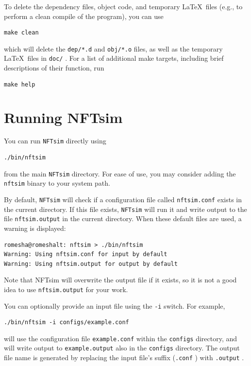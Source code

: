 \documentclass[12pt,a4paper]{article}
\newcommand{\type}[1]{{\small\small\tt #1} }
\newcommand{\NF}[0]{\type{NFTsim}}
\begin{document}
To delete the dependency files, object code, and temporary \LaTeX\ files (e.g., to perform a clean compile of the program), you can use
\begin{lstlisting}
make clean
\end{lstlisting}
which will delete the \type{dep/*.d} and \type{obj/*.o} files, as well as the temporary \LaTeX\ files in \type{doc/}. For a list of additional make targets, including brief descriptions of their function, run
\begin{lstlisting}
make help
\end{lstlisting}

\section{Running NFTsim}
\label{sec:running}
You can run \NF directly using

\begin{lstlisting}
./bin/nftsim
\end{lstlisting}

from the main \NF directory. For ease of use, you may consider adding the \type{nftsim} binary to your system path.

By default, \NF will check if a configuration file called \type{nftsim.conf} exists in the current directory. If this file exists, \NF will run it and write output to the file \type{nftsim.output} in the current directory. When these default files are used, a warning is displayed:

\begin{lstlisting}
romesha@romeshalt: nftsim > ./bin/nftsim
Warning: Using nftsim.conf for input by default
Warning: Using nftsim.output for output by default
\end{lstlisting}

Note that NFTsim will overwrite the output file if it exists, so it is not a good idea to use \type{nftsim.output} for your work.

You can optionally provide an input file using the \type{-i} switch. For example,

\begin{lstlisting}
./bin/nftsim -i configs/example.conf
\end{lstlisting}

will use the configuration file \type{example.conf} within the \type{configs} directory, and will write output to \type{example.output} also in the \type{configs} directory. The output file name is generated by replacing the input file's suffix (\type{.conf}) with \type{.output}.
\end{document}
